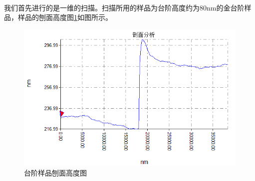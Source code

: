 \paragraph*{}
我们首先进行的是一维的扫描。扫描所用的样品为台阶高度约为80nm的金台阶样品，样品的刨面高度图\ref{fig:15}如图所示。
\begin{figure}[h]
	\centering
	\includegraphics[scale=0.5]{figures/台阶刨面图}
	\caption{台阶样品刨面高度图}
	\label{fig:15}
\end{figure}
